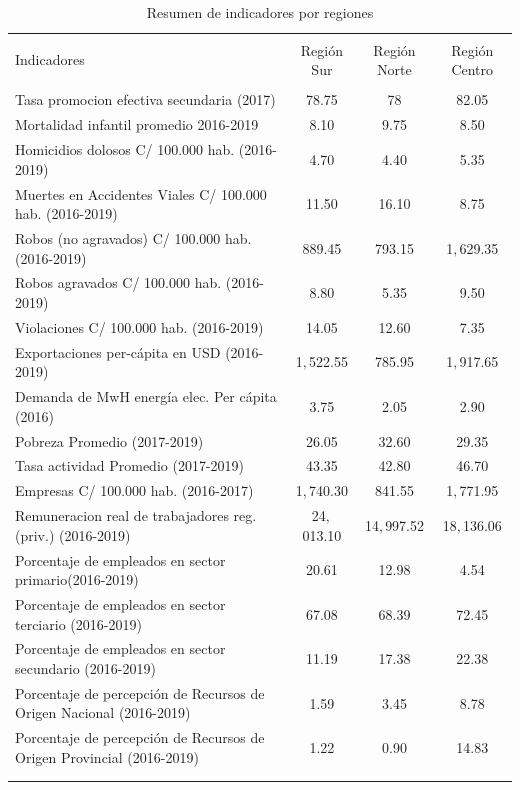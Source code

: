 \documentclass[12pt,a4paper]{article}
\begin{document}
\begin{table}[!htbp] 
\center
\scriptsize
\raggedleft
  \caption{\\Resumen de indicadores por regiones} 
  \label{cuadro:indicadores} 
\begin{tabular}{@{\extracolsep{5pt}} lccc} 
\\[-1.8ex]\hline 
\hline \\[-1.8ex] 
 Indicadores & Región Sur & Región Norte & Región Centro \\ 
\hline \\[-1.8ex] 
Tasa promocion efectiva secundaria (2017) & 78.75 & 78 & 82.05 \\ 
Mortalidad infantil promedio 2016-2019 & 8.10 & 9.75 & 8.50 \\ 
Homicidios dolosos C/ 100.000 hab. (2016-2019) & 4.70 & 4.40 & 5.35 \\ 
Muertes en Accidentes Viales C/ 100.000  hab.  (2016-2019) & 11.50 & 16.10 & 8.75 \\ 
Robos (no agravados) C/ 100.000 hab. (2016-2019) & 889.45 & 793.15 & 1$,$629.35 \\ 
Robos agravados C/ 100.000 hab. (2016-2019) & 8.80 & 5.35 & 9.50 \\ 
Violaciones  C/ 100.000 hab. (2016-2019) & 14.05 & 12.60 & 7.35 \\ 
Exportaciones per-cápita en USD (2016-2019) & 1$,$522.55 & 785.95 & 1$,$917.65 \\ 
Demanda de MwH energía elec. Per cápita (2016) & 3.75 & 2.05 & 2.90 \\ 
Pobreza Promedio (2017-2019) & 26.05 & 32.60 & 29.35 \\ 
Tasa actividad Promedio (2017-2019) & 43.35 & 42.80 & 46.70 \\ 
Empresas  C/ 100.000 hab. (2016-2017) & 1$,$740.30 & 841.55 & 1$,$771.95 \\ 
Remuneracion  real de trabajadores reg. (priv.) (2016-2019) & 24$,$013.10 & 14$,$997.52 & 18$,$136.06 \\ 
Porcentaje de empleados en sector primario(2016-2019) & 20.61 & 12.98 & 4.54 \\ 
Porcentaje de empleados en sector terciario (2016-2019) & 67.08 & 68.39 & 72.45 \\ 
Porcentaje de empleados en sector secundario (2016-2019) & 11.19 & 17.38 & 22.38 \\ 
Porcentaje de percepción de Recursos de Origen Nacional (2016-2019) & 1.59 & 3.45 & 8.78 \\ 
Porcentaje de percepción de Recursos de Origen Provincial  (2016-2019) & 1.22 & 0.90 & 14.83 \\ 
\\ 
\hline \\[-1.8ex] 

\end{tabular} 
\end{table} 
\end{document}
